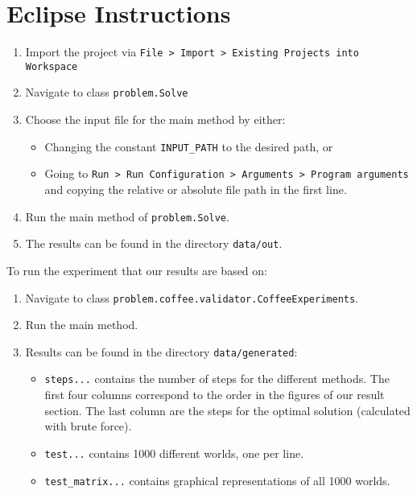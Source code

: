 \section{Eclipse Instructions}


\begin{enumerate}
	\item Import the project via \texttt{File > Import > Existing Projects into Workspace}
	\item Navigate to class \texttt{problem.Solve}
	\item Choose the input file for the main method by either:
	\begin{itemize}
		\item Changing the constant \texttt{INPUT\_PATH} to the desired path, or
		\item Going to \texttt{Run > Run Configuration > Arguments > Program arguments} and copying the relative or absolute file path in the first line.
	\end{itemize}
	\item Run the main method of \texttt{problem.Solve}.
	\item The results can be found in the directory \texttt{data/out}.
\end{enumerate}


To run the experiment that our results are based on:

\begin{enumerate}
	\item Navigate to class \texttt{problem.coffee.validator.CoffeeExperiments}.
	\item Run the main method.
	\item Results can be found in the directory \texttt{data/generated}:
	\begin{itemize}
		\item \texttt{steps...} contains the number of steps for the different methods. The first four columns correspond to the order in the figures of our result section. The last column are the steps for the optimal solution (calculated with brute force).
		\item \texttt{test...} contains 1000 different worlds, one per line.
		\item \texttt{test\_matrix...} contains graphical representations of all 1000 worlds.
	\end{itemize}
	
\end{enumerate}

